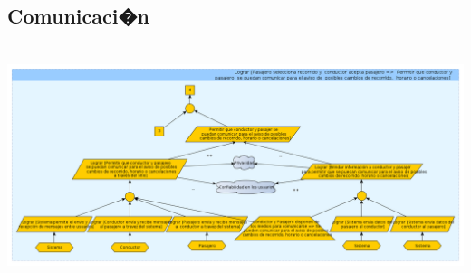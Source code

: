 \documentclass[a4paper,titlepage,10pt]{article}
\begin{document}
\subsection{Comunicaci�n}
\includegraphics[height=7cm,width=19.5cm]{imagenes/Comunicacion.png}
\end{document}
